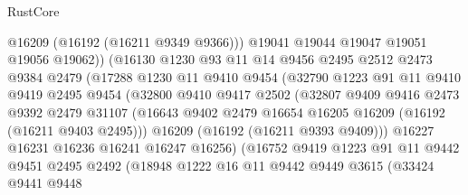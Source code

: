 \begin{lexlean}{RustCore}
\begin{coremodule}
                          @16209
                          (@16192 (@16211 @9349 @9366)))
                        @19041
                        @19044
                        @19047
                        @19051
                        @19056
                        @19062))
                    (@16130
                      @1230
                      @93
                      @11
                      @14
                      @9456
                      @2495
                      @2512
                      @2473
                      @9384
                      @2479
                      (@17288
                        @1230
                        @11
                        @9410
                        @9454
                        (@32790
                          @1223
                          @91
                          @11
                          @9410
                          @9419
                          @2495
                          @9454
                          (@32800
                            @9410
                            @9417
                            @2502
                            (@32807
                              @9409
                              @9416
                              @2473
                              @9392
                              @2479
                              @31107
                              (@16643
                                @9402
                                @2479
                                @16654
                                @16205
                                @16209
                                (@16192 (@16211 @9403 @2495)))
                              @16209
                              (@16192 (@16211 @9393 @9409)))
                            @16227
                            @16231
                            @16236
                            @16241
                            @16247
                            @16256)
                          (@16752
                            @9419
                            @1223
                            @91
                            @11
                            @9442
                            @9451
                            @2495
                            @2492
                            (@18948
                              @1222
                              @16
                              @11
                              @9442
                              @9449
                              @3615
                              (@33424
                                @9441
                                @9448

\end{coremodule}
\end{lexlean}

